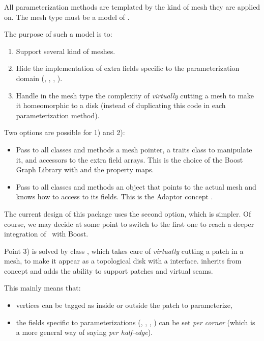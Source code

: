All parameterization methods are templated by the kind of mesh they are applied on.
The mesh type must be a model of .

The purpose of such a model is to:
\begin{enumerate}
\item Support several kind of meshes.
\item Hide the implementation of extra fields specific to the parameterization domain
      (, , , ).
\item Handle in the mesh type the complexity of \emph{virtually} cutting a mesh
      to make it homeomorphic to a disk (instead of duplicating this
      code in each parameterization method).
\end{enumerate}

Two options are possible for 1) and 2):
\begin{itemize}
\item Pass to all classes and methods a mesh pointer, a traits class to manipulate it,
      and accessors to the extra field arrays.
      This is the choice of the Boost Graph Library with 
      and the property maps.
\item Pass to all classes and methods an object that points to the actual mesh and knows
      how to access to its fields. This is the Adaptor concept \cite{cgal:ghjv-dpero-95}.
\end{itemize}

The current design of this package uses the second option, which is simpler.
Of course, we may decide at some point to switch to the first one to reach a deeper integration
of \cgal\ with Boost.

Point 3) is solved by class ,
which takes care of \emph{virtually} cutting
a patch in a  mesh, to make it appear as a topological disk
with a  interface.
 inherits from concept  and adds
the ability to support patches and virtual seams. 

This mainly means that:
\begin{itemize}
\item vertices can be tagged as inside or outside the patch to parameterize,
\item the fields specific to parameterizations (, , , )
      can be set {\em per corner} (which is a more general way of saying {\em per half-edge}).
\end{itemize}


